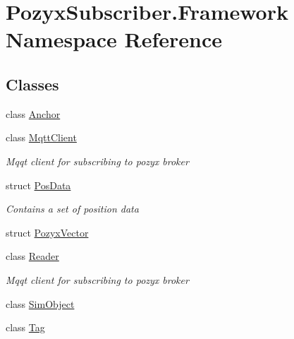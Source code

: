 \hypertarget{namespace_pozyx_subscriber_1_1_framework}{}\section{Pozyx\+Subscriber.\+Framework Namespace Reference}
\label{namespace_pozyx_subscriber_1_1_framework}
\subsection*{Classes}
\begin{DoxyCompactItemize}
\item 
class \hyperlink{class_pozyx_subscriber_1_1_framework_1_1_anchor}{Anchor}
\item 
class \hyperlink{class_pozyx_subscriber_1_1_framework_1_1_mqtt_client}{Mqtt\+Client}
\begin{DoxyCompactList}\small\item\em Mqqt client for subscribing to pozyx broker \end{DoxyCompactList}\item 
struct \hyperlink{struct_pozyx_subscriber_1_1_framework_1_1_pos_data}{Pos\+Data}
\begin{DoxyCompactList}\small\item\em Contains a set of position data \end{DoxyCompactList}\item 
struct \hyperlink{struct_pozyx_subscriber_1_1_framework_1_1_pozyx_vector}{Pozyx\+Vector}
\item 
class \hyperlink{class_pozyx_subscriber_1_1_framework_1_1_reader}{Reader}
\begin{DoxyCompactList}\small\item\em Mqqt client for subscribing to pozyx broker \end{DoxyCompactList}\item 
class \hyperlink{class_pozyx_subscriber_1_1_framework_1_1_sim_object}{Sim\+Object}
\item 
class \hyperlink{class_pozyx_subscriber_1_1_framework_1_1_tag}{Tag}
\end{DoxyCompactItemize}

